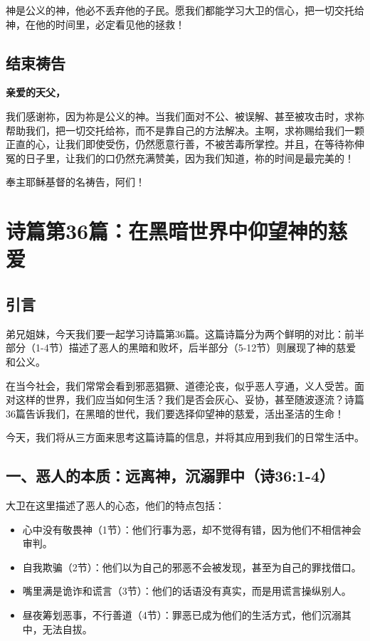 \documentclass[a4paper, 12pt]{article}
\begin{document}
神是公义的神，他必不丢弃他的子民。愿我们都能学习大卫的信心，把一切交托给神，在他的时间里，必定看见他的拯救！

\subsection*{结束祷告}
\textbf{亲爱的天父，}

我们感谢祢，因为祢是公义的神。当我们面对不公、被误解、甚至被攻击时，求祢帮助我们，把一切交托给祢，而不是靠自己的方法解决。主啊，求祢赐给我们一颗正直的心，让我们即使受伤，仍然愿意行善，不被苦毒所掌控。并且，在等待祢伸冤的日子里，让我们的口仍然充满赞美，因为我们知道，祢的时间是最完美的！

奉主耶稣基督的名祷告，阿们！
\newpage
\section{诗篇第36篇：在黑暗世界中仰望神的慈爱}
\subsection*{引言}
\hspace{0.6cm}弟兄姐妹，今天我们要一起学习诗篇第36篇。这篇诗篇分为两个鲜明的对比：前半部分（1-4节）描述了恶人的黑暗和败坏，后半部分（5-12节）则展现了神的慈爱和公义。

在当今社会，我们常常会看到邪恶猖獗、道德沦丧，似乎恶人亨通，义人受苦。面对这样的世界，我们应当如何生活？我们是否会灰心、妥协，甚至随波逐流？诗篇36篇告诉我们，在黑暗的世代，我们要选择仰望神的慈爱，活出圣洁的生命！

今天，我们将从三方面来思考这篇诗篇的信息，并将其应用到我们的日常生活中。

\subsection*{一、恶人的本质：远离神，沉溺罪中（诗36:1-4）}

大卫在这里描述了恶人的心态，他们的特点包括：
\begin{itemize}
    \item 心中没有敬畏神（1节）：他们行事为恶，却不觉得有错，因为他们不相信神会审判。

    \item 自我欺骗（2节）：他们以为自己的邪恶不会被发现，甚至为自己的罪找借口。

    \item 嘴里满是诡诈和谎言（3节）：他们的话语没有真实，而是用谎言操纵别人。

    \item 昼夜筹划恶事，不行善道（4节）：罪恶已成为他们的生活方式，他们沉溺其中，无法自拔。

\end{itemize}
\end{document}
